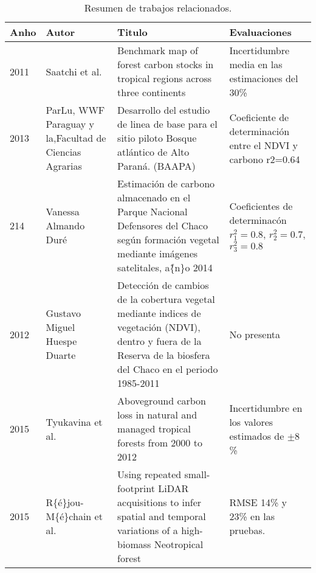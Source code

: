 \begin{table}[!hbtp]
	\centering
	\caption{Resumen de trabajos relacionados.}
	\label{t:resumenrelacionado}
	\begin{tabular}{|p{3cm}|p{3cm}|p{3cm}|p{3cm}|}
		\hline
		\rowcolor[HTML]{EFEFEF} 
		\textbf{Anho} & \textbf{Autor}                                         & \textbf{Titulo}                                                                                                                                                        & \textbf{Evaluaciones}                                                                     \\ \hline
		2011          & Saatchi et al.                                         & Benchmark map of forest carbon stocks in tropical regions across three continents                                                                                      & Incertidumbre media en las estimaciones del 30\%                                          \\ \hline
		2013          & ParLu, WWF Paraguay y la,Facultad de Ciencias Agrarias & Desarrollo del estudio de linea de base para el sitio piloto Bosque atl\'antico de Alto Paran\'a. (BAAPA)                                                               & Coeficiente de determinaci\'on entre el NDVI y carbono r2=0.64                              \\ \hline
		214           & Vanessa Almando Dur\'e                                 & Estimaci\'on de carbono almacenado en el Parque Nacional Defensores del Chaco seg\'un formaci\'on vegetal mediante im\'agenes satelitales, a\~\{n\}o 2014              & Coeficientes de determinac\'on $ r_{1}^{2}=0.8$, $ r_{2}^{2}=0.7 $, $r_{3}^{2}=0.8 $      \\ \hline
		2012          & Gustavo Miguel Huespe Duarte                           & Detecci\'on de cambios de la cobertura vegetal mediante indices de vegetaci\'on (NDVI), dentro y fuera de la Reserva de la biosfera del Chaco en el periodo 1985-2011  & No presenta                                                                               \\ \hline
		2015          & Tyukavina et al.                                       & Aboveground carbon loss in natural and managed tropical forests from 2000 to 2012                                                                                      & Incertidumbre en los valores estimados de $ \pm 8 $\%                                     \\ \hline
		2015          & R\{\'e\}jou-M\{\'e\}chain et al.                       & Using repeated small-footprint LiDAR acquisitions to infer spatial and temporal variations of a high-biomass Neotropical forest                                        & RMSE 14\% y 23\% en las pruebas.                                                          \\ \hline

\end{tabular}
\end{table}
